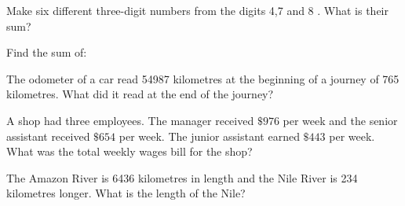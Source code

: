 \begin{exercises}
\begin{questions}
\begin{parts}
        \end{parts}
        \Question[2] Make six different three-digit numbers from the digits 4,7 and 8 . What is their sum?
        \begin{solutionordottedlines}[2in]
        \end{solutionordottedlines}
        \Question[3] Find the sum of:
        \Question[2] The odometer of a car read 54987 kilometres at the beginning of a journey of 765 kilometres. What did it read at the end of the journey?
        \begin{solutionordottedlines}[1in]
        \end{solutionordottedlines}
        \Question[2] A shop had three employees. The manager received \(\$ 976\) per week and the senior assistant received \(\$ 654\) per week. The junior assistant earned \(\$ 443\) per week. What was the total weekly wages bill for the shop?
        \begin{solutionordottedlines}[1in]
        \end{solutionordottedlines}
        \Question[2] The Amazon River is 6436 kilometres in length and the Nile River is 234 kilometres longer. What is the length of the Nile?
        \begin{solutionordottedlines}[1in]
        \end{solutionordottedlines}
    \end{questions}
\end{exercises}




